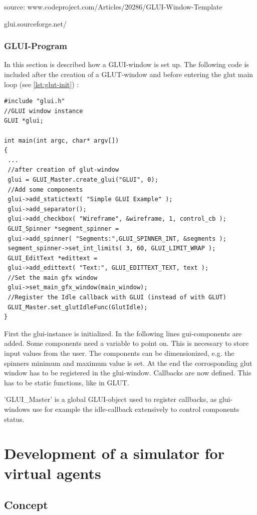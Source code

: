 \documentclass[10pt,a4paper,DIV=11]{scrreprt}
\begin{document}
source: www.codeproject.com/Articles/20286/GLUI-Window-Template

glui.sourceforge.net/


\subsection{GLUI-Program}
In this section is described how a GLUI-window is set up.
The following code is included after the creation of a GLUT-window and before entering the glut main loop (see \ref{lst:glut-init}) :


\begin{lstlisting}[caption={Creating a GLUI-window},label=lst:glui-create]
#include "glui.h"
//GLUI window instance
GLUI *glui;

int main(int argc, char* argv[])
{
 ...
 //after creation of glut-window
 glui = GLUI_Master.create_glui("GLUI", 0);
 //Add some components
 glui->add_statictext( "Simple GLUI Example" );
 glui->add_separator();
 glui->add_checkbox( "Wireframe", &wireframe, 1, control_cb );
 GLUI_Spinner *segment_spinner =
 glui->add_spinner( "Segments:",GLUI_SPINNER_INT, &segments );
 segment_spinner->set_int_limits( 3, 60, GLUI_LIMIT_WRAP );
 GLUI_EditText *edittext =
 glui->add_edittext( "Text:", GLUI_EDITTEXT_TEXT, text );
 //Set the main gfx window
 glui->set_main_gfx_window(main_window);
 //Register the Idle callback with GLUI (instead of with GLUT)
 GLUI_Master.set_glutIdleFunc(GlutIdle);
}
\end{lstlisting}

First the glui-instance is initialized. In the following lines gui-components are added. Some components need a variable to point on. This is necessary to store input values from the user. The components can be dimensionized, e.g. the spinners minimum and maximum value is set.
At the end the corrosponding glut window has to be registered in the glui-window.
Callbacks are now defined. This has to be static functions, like in GLUT.

'GLUI\_Master' is a global GLUI-object used to register callbacks, as glui-windows use for example the idle-callback extensively to control components status.

\chapter{Development of a simulator for virtual agents}

\section{Concept}
\end{document}
